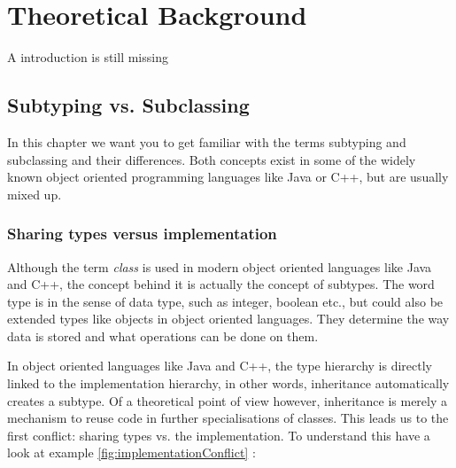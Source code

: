 
\part{Theoretical Background}
A introduction is still missing

\chapter{Subtyping vs. Subclassing}
\label{chap:subtypingVsSubclassing}
In this chapter we want you to get familiar with the terms subtyping
and subclassing and their differences. Both concepts exist in some of
the widely known object oriented programming languages like Java or C++,
but are usually mixed up.

\section{Sharing types versus implementation}
\label{sec:sharingTypes}

Although the term \emph{class} is used in modern object oriented
languages like Java and C++, the concept behind it is actually the
concept of subtypes.	The word type is in the sense of data type, such
as integer, boolean etc., but could also be extended types like objects
in object oriented languages. They determine the way data is stored and
what operations can be done on them.

In object oriented languages like Java and C++, the type hierarchy
is directly linked to the implementation hierarchy, in other words,
inheritance automatically creates a subtype. Of a theoretical point
of view however, inheritance is merely a mechanism to reuse code in
further specialisations of classes. This leads us to the first conflict:
sharing types vs. the implementation. To understand this have a look at
example \ref{fig:implementationConflict} \cite{simons_theory_2003-4}:

